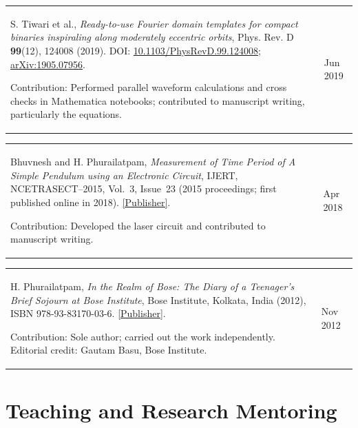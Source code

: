 \documentclass[margin,line]{res}
\begin{document}
\begin{resume}
\begin{tabular}{@{}p{\dimexpr\linewidth-0.62in-3\tabcolsep\relax}p{0.62in}}
    S. Tiwari et al., \textit{Ready-to-use Fourier domain templates for compact binaries inspiraling along moderately eccentric orbits}, Phys. Rev. D \textbf{99}(12), 124008 (2019). DOI: \href{https://doi.org/10.1103/PhysRevD.99.124008}{10.1103/PhysRevD.99.124008}; \href{https://arxiv.org/abs/1905.07956}{arXiv:1905.07956}.
    \par\smallskip Contribution: Performed parallel waveform calculations and cross checks in Mathematica notebooks; contributed to manuscript writing, particularly the equations. & \raggedright Jun 2019
\end{tabular}

\begin{tabular}{@{}p{\dimexpr\linewidth-0.62in-3\tabcolsep\relax}p{0.62in}}
    Bhuvnesh and H. Phurailatpam, \textit{Measurement of Time Period of A Simple Pendulum using an Electronic Circuit}, IJERT, NCETRASECT--2015, Vol.~3, Issue~23 (2015 proceedings; first published online in 2018). \href{https://www.ijert.org/measurement-of-time-period-of-a-simple-pendulum-using-an-electronic-circuit}{[Publisher]}.
    \par\smallskip Contribution: Developed the laser circuit and contributed to manuscript writing. & \raggedright Apr 2018
\end{tabular}

\begin{tabular}{@{}p{\dimexpr\linewidth-0.62in-3\tabcolsep\relax}p{0.62in}}
    H. Phurailatpam, \textit{In the Realm of Bose: The Diary of a Teenager's Brief Sojourn at Bose Institute}, Bose Institute, Kolkata, India (2012), ISBN 978-93-83170-03-6. \href{https://jcbose.ac.in/publication}{[Publisher]}.
    \par\smallskip Contribution: Sole author; carried out the work independently. Editorial credit: Gautam Basu, Bose Institute. & \raggedright Nov 2012
\end{tabular}

\par\endgroup
\vspace{.2in}
\section{\sc Teaching and Research Mentoring}


\end{resume}
\end{document}
